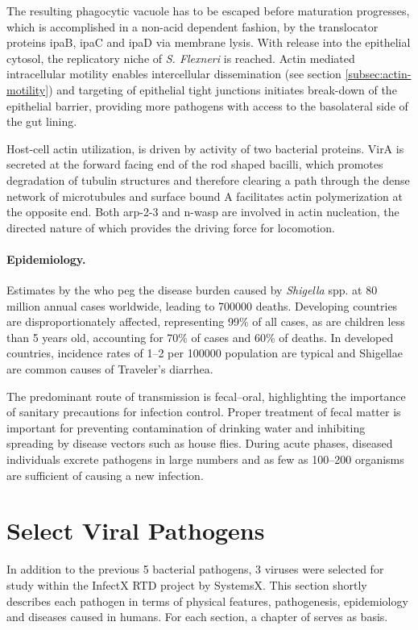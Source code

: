 The resulting phagocytic vacuole has to be escaped before maturation progresses, which is accomplished in a non-acid dependent fashion, by the translocator proteins \gls{ipa}B, \gls{ipa}C and \gls{ipa}D via membrane lysis. With release into the epithelial cytosol, the replicatory niche of \textit{S. Flexneri} is reached. Actin mediated intracellular motility enables intercellular dissemination (see section \ref{subsec:actin-motility}) and targeting of epithelial tight junctions initiates break-down of the epithelial barrier, providing more pathogens with access to the basolateral side of the gut lining.

Host-cell actin utilization, is driven by activity of two bacterial proteins. VirA is secreted at the forward facing end of the rod shaped bacilli, which promotes degradation of tubulin structures and therefore clearing a path through the dense network of microtubules and surface bound A facilitates actin polymerization at the opposite end. Both \gls{arp-2-3} and \gls{n-wasp} are involved in actin nucleation, the directed nature of which provides the driving force for locomotion.

\paragraph{Epidemiology.}
Estimates by the \gls{who} peg the disease burden caused by \textit{Shigella} spp. at 80 million annual cases worldwide, leading to 700000 deaths. Developing countries are disproportionately affected, representing 99\% of all cases, as are children less than 5 years old, accounting for 70\% of cases and 60\% of deaths. In developed countries, incidence rates of 1--2 per 100000 population are typical and Shigellae are common causes of Traveler's diarrhea.

The predominant route of transmission is fecal--oral, highlighting the importance of sanitary precautions for infection control. Proper treatment of fecal matter is important for preventing contamination of drinking water and inhibiting spreading by disease vectors such as house flies. During acute phases, diseased individuals excrete pathogens in large numbers and as few as 100--200 organisms are sufficient of causing a new infection.

\section{Select Viral Pathogens}

In addition to the previous 5 bacterial pathogens, 3 viruses were selected for study within the InfectX RTD project by SystemsX. This section shortly describes each pathogen in terms of physical features, pathogenesis, epidemiology and diseases caused in humans. For each section, a chapter of \cite{Craighead2000} serves as basis.

